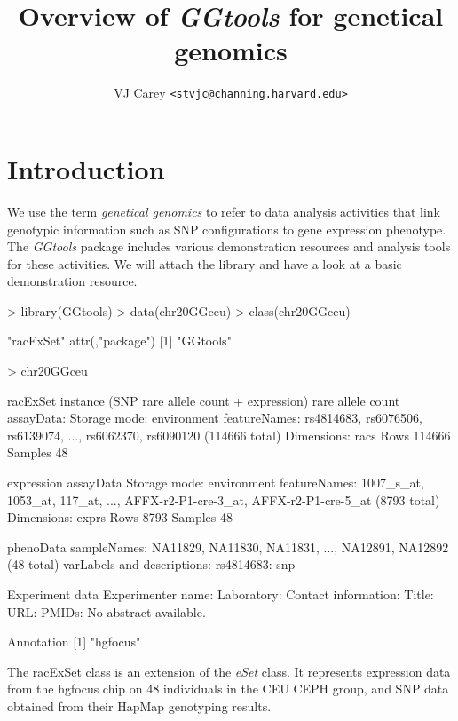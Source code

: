\documentclass[12pt]{article}
\newcommand{\Rpackage}[1]{{\textit{#1}}}
\newcommand{\Rclass}[1]{{\textit{#1}}}
\begin{document}

\title{Overview of \Rpackage{GGtools} for genetical genomics}
\author{VJ Carey \texttt{<stvjc@channing.harvard.edu>}}
\maketitle

\section{Introduction}

We use the term \textit{genetical genomics} to refer to
data analysis activities that link genotypic information
such as SNP configurations to gene expression phenotype.
The \Rpackage{GGtools} package includes various
demonstration resources and analysis tools for these
activities.
We will attach the library and have a look at a basic
demonstration resource.
\begin{Schunk}
\begin{Sinput}
> library(GGtools)
> data(chr20GGceu)
> class(chr20GGceu)
\end{Sinput}
\begin{Soutput}
[1] "racExSet"
attr(,"package")
[1] "GGtools"
\end{Soutput}
\begin{Sinput}
> chr20GGceu
\end{Sinput}
\begin{Soutput}
racExSet instance (SNP rare allele count + expression)
rare allele count assayData:
  Storage mode: environment 
  featureNames: rs4814683, rs6076506, rs6139074, ..., rs6062370, rs6090120 (114666 total)
  Dimensions:
          racs
Rows    114666
Samples     48

expression assayData
  Storage mode: environment 
  featureNames: 1007_s_at, 1053_at, 117_at, ..., AFFX-r2-P1-cre-3_at, AFFX-r2-P1-cre-5_at (8793 total)
  Dimensions:
        exprs
Rows     8793
Samples    48

phenoData
  sampleNames: NA11829, NA11830, NA11831, ..., NA12891, NA12892 (48 total)
  varLabels and descriptions:
    rs4814683: snp

Experiment data
  Experimenter name:  
  Laboratory:  
  Contact information:  
  Title:  
  URL:  
  PMIDs:  
  No abstract available.

Annotation [1] "hgfocus"
\end{Soutput}
\end{Schunk}
The racExSet class is an extension of the
\Rclass{eSet} class.  It represents expression
data from the hgfocus chip on 48 individuals in the CEU
CEPH group, and SNP data obtained from their HapMap genotyping
results.
\end{document}
